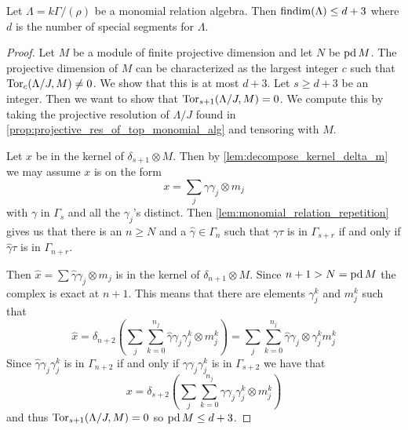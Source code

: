\begin{theorem}\cite[Corollary~2.4]{GKK91}
	Let $\Lambda = k\Gamma/(\rho)$ be a monomial relation algebra. Then $\operatorname{findim}(\Lambda) \leq d+3$ where $d$ is the number of special segments for $\Lambda$.
	\begin{proof}
		Let $M$ be a module of finite projective dimension and let $N$ be $\operatorname{pd} M$. The projective dimension of $M$ can be characterized as the largest integer $c$ such that $\operatorname{Tor}_c(\Lambda/J, M) \neq 0$. We show that this is at most $d+3$. Let $s \geq d+3$ be an integer. Then we want to show that $\operatorname{Tor}_{s+1}(\Lambda/J, M)=0$. We compute this by taking the projective resolution of $\Lambda/J$ found in \cref{prop:projective_res_of_top_monomial_alg} and tensoring with $M$.
		\begin{center}
		\end{center}
		Let $x$ be in the kernel of $\delta_{s+1}\otimes M$. Then by \cref{lem:decompose_kernel_delta_m} we may assume $x$ is on the form
		$$x = \sum_j \gamma \gamma_j \otimes m_j$$
		with $\gamma$ in $\Gamma_s$ and all the $\gamma_j$'s distinct. Then \cref{lem:monomial_relation_repetition} gives us that there is an $n \geq N$ and a $\hat{\gamma} \in \Gamma_n$ such that $\gamma\tau$ is in $\Gamma_{s+r}$ if and only if $\hat{\gamma}\tau$ is in $\Gamma_{n+r}$.
		
		Then $\hat{x} = \sum \hat{\gamma}\gamma_j \otimes m_j$ is in the kernel of $\delta_{n+1}\otimes M$. Since $n+1>N=\operatorname{pd} M$ the complex is exact at $n+1$. This means that there are elements $\gamma_j^k$ and $m_j^k$ such that
		$$\hat{x} = \delta_{n+2} \left(\sum_j \sum_{k=0}^{n_j} \hat{\gamma}\gamma_j\gamma_j^k \otimes m_j^k\right) = 
		\sum_j \sum_{k=0}^{n_j} \hat{\gamma}\gamma_j \otimes \gamma_j^k m_j^k$$
		Since $\hat{\gamma}\gamma_j\gamma_j^k$ is in $\Gamma_{n+2}$ if and only if $\gamma\gamma_j\gamma_j^k$ is in $\Gamma_{s+2}$ we have that
		$$x = \delta_{s+2} \left(\sum_j \sum_{k=0}^{n_j} {\gamma}\gamma_j\gamma_j^k \otimes m_j^k\right)$$
		and thus $\operatorname{Tor}_{s+1}(\Lambda/J, M)=0$ so $\operatorname{pd} M \leq d+3$.
	\end{proof}
\end{theorem}



